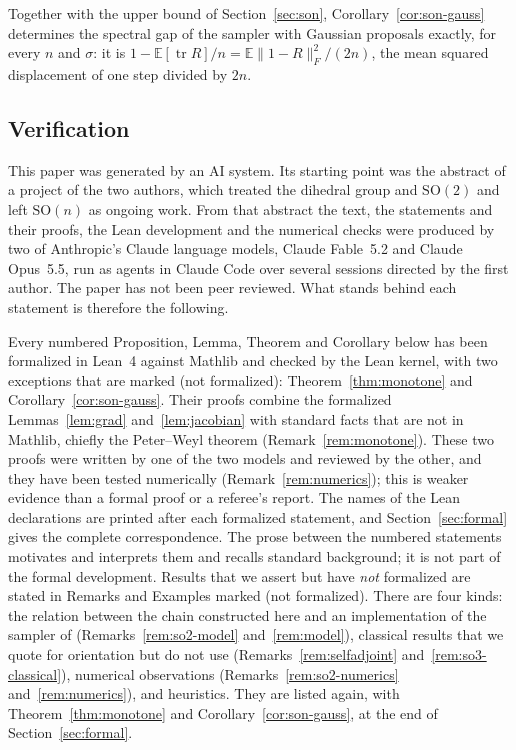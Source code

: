 \documentclass[11pt]{amsart}
\theoremstyle{definition}
\theoremstyle{remark}
\newcommand{\notformal}{\textup{(not formalized)}}
\newcommand{\E}{\mathbb{E}}
\newcommand{\SO}{\mathrm{SO}}
\newcommand{\tr}{\operatorname{tr}}
\newcommand{\fro}[1]{\lVert #1\rVert_{F}}
\begin{document}
Together with the upper bound of Section~\ref{sec:son}, Corollary~\ref{cor:son-gauss} determines
the spectral gap of the sampler with Gaussian proposals exactly, for every $n$ and $\sigma$: it is
$1-\E[\tr R]/n=\E\fro{1-R}^2/(2n)$, the mean squared displacement of one step divided by $2n$.

\subsection{Verification}\label{sec:verif-intro}
This paper was generated by an AI system.  Its starting point was the abstract of a project of
the two authors, which treated the dihedral group and $\SO(2)$ and left $\SO(n)$ as ongoing
work.  From that abstract the text, the statements and their proofs, the Lean development and
the numerical checks were produced by two of Anthropic's Claude language models, Claude
Fable~5.2 and Claude Opus~5.5, run as agents in Claude Code over several sessions directed by
the first author.  The paper has not been peer reviewed.  What stands behind each statement is therefore the following.

Every numbered Proposition, Lemma, Theorem and Corollary below has been formalized in Lean~4
\cite{Lean4} against Mathlib \cite{Mathlib} and checked by the Lean kernel, with two exceptions
that are marked \notformal: Theorem~\ref{thm:monotone} and Corollary~\ref{cor:son-gauss}.  Their
proofs combine the formalized Lemmas~\ref{lem:grad} and~\ref{lem:jacobian} with standard facts
that are not in Mathlib, chiefly the Peter--Weyl theorem (Remark~\ref{rem:monotone}).  These two
proofs were written by one of the two models and reviewed by the other, and they have been
tested numerically (Remark~\ref{rem:numerics}); this is weaker evidence than a formal proof or
a referee's report.  The names
of the Lean declarations are printed after each formalized statement, and
Section~\ref{sec:formal} gives the complete correspondence.  The prose between the numbered statements motivates and interprets
them and recalls standard background; it is not part of the formal development.  Results that
we assert but have \emph{not} formalized are stated in Remarks and Examples marked \notformal.
There are four kinds: the relation between the chain constructed here and an implementation of
the sampler of \cite{ZHG} (Remarks~\ref{rem:so2-model} and~\ref{rem:model}), classical results
that we quote for orientation but do not use (Remarks~\ref{rem:selfadjoint}
and~\ref{rem:so3-classical}), numerical observations (Remarks~\ref{rem:so2-numerics}
and~\ref{rem:numerics}), and heuristics.  They are listed again, with
Theorem~\ref{thm:monotone} and Corollary~\ref{cor:son-gauss}, at the end of
Section~\ref{sec:formal}.
\end{document}
